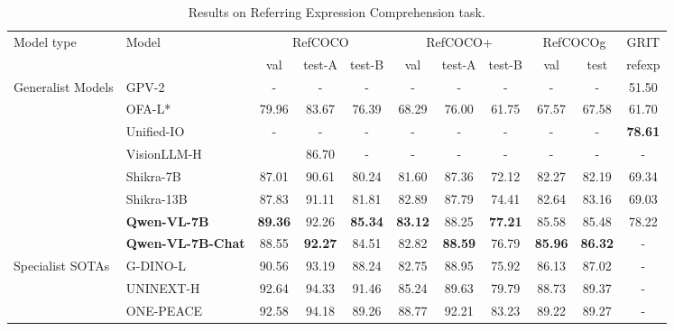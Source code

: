 \documentclass{article}
\newcommand{\tablestyle}[2]{\setlength{\tabcolsep}{#1}\renewcommand{\arraystretch}{#2}\centering\footnotesize}
\begin{document}
\begin{table}[]
\centering
\caption{Results on Referring Expression Comprehension task.}
\tablestyle{3pt}{1.05}
\begin{tabular}{@{}l|l|ccccccccc@{}}
\toprule
\multirow{2}{*}{Model type} & \multirow{2}{*}{Model} & \multicolumn{3}{c}{RefCOCO} & \multicolumn{3}{c}{RefCOCO+} & \multicolumn{2}{c}{RefCOCOg} & GRIT \\
 &  & val & test-A & test-B & val & test-A & test-B & val & test & refexp \\ \midrule
\multirow{8}{*}{Generalist Models} & GPV-2 & - & - & - & - & - & - & - & - & 51.50 \\
 & OFA-L* & 79.96 & 83.67 & 76.39 & 68.29 & 76.00 & 61.75 & 67.57 & 67.58 & 61.70 \\
 & Unified-IO & - & - & - & - & - & - & - & - & \textbf{78.61} \\
 & VisionLLM-H &  & 86.70 & - & - & - & - & - & - & - \\
 & Shikra-7B & 87.01 & 90.61 & 80.24 & 81.60 & 87.36 & 72.12 & 82.27 & 82.19 & 69.34 \\
 & Shikra-13B & 87.83 & 91.11 & 81.81 & 82.89 & 87.79 & 74.41 & 82.64 & 83.16 & 69.03 \\
 & \textbf{Qwen-VL-7B} & \textbf{89.36} & 92.26 & \textbf{85.34} & \textbf{83.12} & 88.25 & \textbf{77.21} & 85.58 & 85.48 & 78.22 \\
 & \textbf{Qwen-VL-7B-Chat} & 88.55 & \textbf{92.27} & 84.51 & 82.82 & \textbf{88.59} & 76.79 & \textbf{85.96} & \textbf{86.32} & - \\ \midrule
\multirow{3}{*}{\color{dt}Specialist SOTAs} & \color{dt}G-DINO-L & \color{dt}90.56 & \color{dt}93.19 & \color{dt}88.24 & \color{dt}82.75 & \color{dt}88.95 & \color{dt}75.92 & \color{dt}86.13 & \color{dt}87.02 & \color{dt}- \\
 & \color{dt}UNINEXT-H & \color{dt}92.64 & \color{dt}94.33 & \color{dt}91.46 & \color{dt}85.24 & \color{dt}89.63 & \color{dt}79.79 & \color{dt}88.73 & \color{dt}89.37 & \color{dt}- \\
 & \color{dt}ONE-PEACE & \color{dt}92.58 & \color{dt}94.18 & \color{dt}89.26 & \color{dt}88.77 & \color{dt}92.21 & \color{dt}83.23 & \color{dt}89.22 & \color{dt}89.27 & \color{dt}- \\
 \bottomrule
\end{tabular}
\label{tab:grounding}
\end{table}
\end{document}
